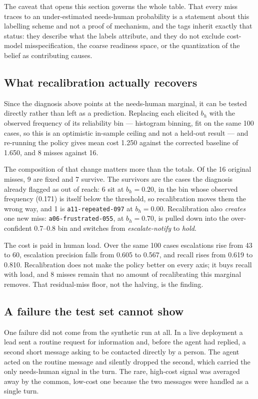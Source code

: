 \documentclass{article}
\begin{document}
The caveat that opens this section governs the whole table. That every miss traces
to an under-estimated needs-human probability is a statement about this labelling
scheme and not a proof of mechanism, and the tags inherit exactly that status: they
describe what the labels attribute, and they do not exclude cost-model
misspecification, the coarse readiness space, or the quantization of the belief as
contributing causes.

\subsection{What recalibration actually recovers}
Since the diagnosis above points at the needs-human marginal, it can be tested
directly rather than left as a prediction. Replacing each elicited $b_h$ with the
observed frequency of its reliability bin --- histogram binning, fit on the same
100 cases, so this is an optimistic in-sample ceiling and not a held-out result ---
and re-running the policy gives mean cost 1.250 against the corrected baseline of
1.650, and 8 misses against
16.

The composition of that change matters more than the totals. Of the 16 original
misses, 9 are fixed and 7 survive. The survivors are the cases the diagnosis
already flagged as out of reach: 6 sit at $b_h = 0.20$, in the bin whose observed
frequency (0.171) is itself below the threshold, so recalibration moves them the
wrong way, and 1 is \texttt{a11-repeated-097} at $b_h = 0.00$. Recalibration also
\emph{creates} one new miss: \texttt{a06-frustrated-055}, at $b_h = 0.70$, is pulled
down into the over-confident 0.7--0.8 bin and switches from
\emph{escalate-notify} to \emph{hold}.

The cost is paid in human load. Over the same 100 cases escalations rise from 43 to
60, escalation precision falls from
0.605 to 0.567, and recall rises from 0.619 to 0.810. Recalibration does not make
the policy better on every axis; it buys recall with load, and 8 misses remain that
no amount of recalibrating this marginal removes. That residual-miss floor, not the
halving, is the finding.


\subsection{A failure the test set cannot show}
One failure did not come from the synthetic run at all. In a live deployment a
lead sent a routine request for information and, before the agent had replied, a
second short message asking to be contacted directly by a person. The agent acted
on the routine message and silently dropped the second, which carried the only
needs-human signal in the turn. The rare, high-cost signal was averaged away by
the common, low-cost one because the two messages were handled as a single turn.
\end{document}
